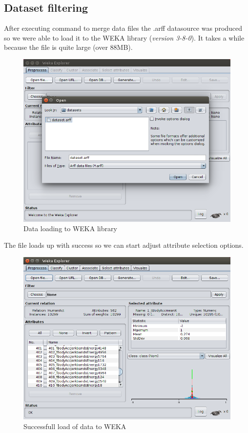 \documentclass[12pt,a4paper]{article}
\begin{document}
\subsection{Dataset filtering}
After executing command to merge data files the .arff datasource was produced so we were able to load it to the WEKA library (\textit{version 3-8-0}). It takes a while because the file is quite large (over 88MB).\\
\begin{figure}[H]
\centering
\includegraphics[scale=0.3]{img/Weka1.png}
\caption{Data loading to WEKA library}
\end{figure}

The file loads up with success so we can start adjust attribute selection options.
\begin{figure}[H]
\centering
\includegraphics[scale=0.3]{img/Weka2.png}
\caption{Successfull load of data to WEKA}
\end{figure}
\end{document}
